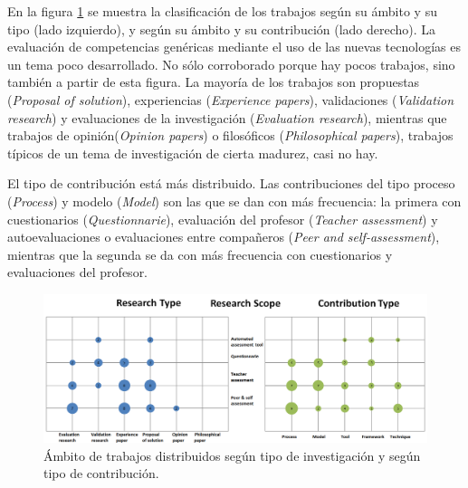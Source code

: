 
En la figura \ref{fig:Burble} se muestra la clasificación de los trabajos según su ámbito y su tipo (lado izquierdo), y según su ámbito y su contribución (lado derecho). La evaluación de competencias genéricas mediante el uso de las nuevas tecnologías es un tema poco desarrollado. No sólo corroborado porque hay pocos trabajos, sino también a partir de esta figura. La mayoría de los trabajos son propuestas (\emph{Proposal of solution}), experiencias (\emph{Experience papers}), validaciones (\emph{Validation research}) y evaluaciones de la investigación (\emph{Evaluation research}), mientras que trabajos de opinión(\emph{Opinion papers}) o filosóficos (\emph{Philosophical papers}), trabajos típicos de un tema de investigación de cierta madurez, casi no hay.

El tipo de contribución está más distribuido. Las contribuciones del tipo proceso (\emph{Process}) y modelo (\emph{Model}) son las que se dan con más frecuencia: la primera con cuestionarios (\emph{Questionnarie}), evaluación del profesor (\emph{Teacher assessment}) y autoevaluaciones o evaluaciones entre compañeros (\emph{Peer and self-assessment}), mientras que la segunda se da con más frecuencia con cuestionarios y evaluaciones del profesor. 

\pagestyle{empty}
\begin{landscape}
\begin{figure}[H]
  \begin{center}
    \includegraphics[scale=0.4]{Burbujas.png}
  \end{center}
  \caption{Ámbito de trabajos distribuidos según tipo de investigación y según tipo de contribución.}
  \label{fig:Burble}
\end{figure}
\end{landscape}
\pagestyle{fancy}

